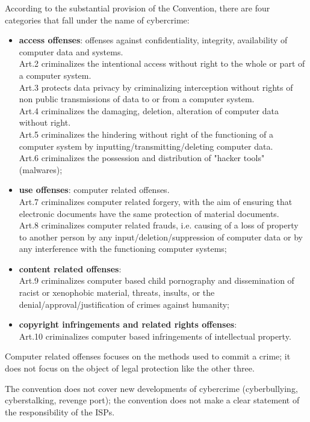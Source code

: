 \documentclass[a4paper, 11pt]{article}
\begin{document}
According to the substantial provision of the Convention, there are four categories that fall under the name of cybercrime:
\begin{itemize}
	\item \textbf{access offenses}: offenses against confidentiality, integrity, availability of computer data and systems.\\
	Art.2 criminalizes the intentional access without right to the whole or part of a computer system.\\
	Art.3 protects data privacy by criminalizing interception without rights of non public transmissions of data to or from a computer system.\\
	Art.4 criminalizes the damaging, deletion, alteration of computer data without right.\\
	Art.5 criminalizes the hindering without right of the functioning of a computer system by inputting/transmitting/deleting computer data.\\
	Art.6 criminalizes the possession and distribution of "hacker tools" (malwares);
	\item \textbf{use offenses}: computer related offenses.\\
	Art.7 criminalizes computer related forgery, with the aim of ensuring that electronic documents have the same protection of material documents.\\
	Art.8 criminalizes computer related frauds, i.e. causing of a loss of property to another person by any input/deletion/suppression of computer data or by any interference with the functioning computer systems;
	\item \textbf{content related offenses}:\\
	Art.9 criminalizes computer based child pornography and dissemination of racist or xenophobic material, threats, insults, or the denial/approval/justification of crimes against humanity;
	\item \textbf{copyright infringements and related rights offenses}:\\
	Art.10 criminalizes computer based infringements of intellectual property.
\end{itemize}

Computer related offenses focuses on the methods used to commit a crime; it does not focus on the object of legal protection like the other three.


The convention does not cover new developments of cybercrime (cyberbullying, cyberstalking, revenge port); the convention does not make a clear statement of the responsibility of the ISPs.
\end{document}
